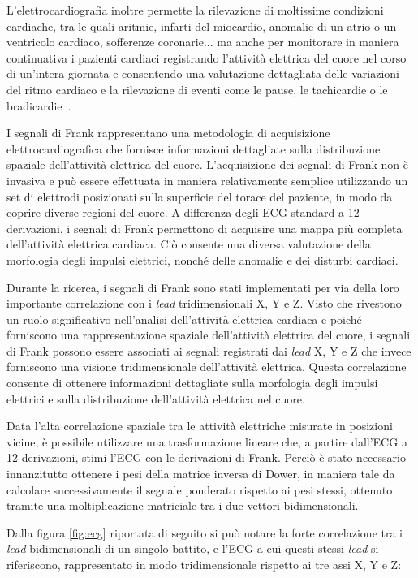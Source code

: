 L'elettrocardiografia inoltre permette la rilevazione di moltissime condizioni cardiache, tra le quali aritmie, infarti del miocardio, anomalie di un atrio o un ventricolo cardiaco, sofferenze coronarie... ma anche per monitorare in maniera continuativa i pazienti cardiaci registrando l'attività elettrica del cuore nel corso di un'intera giornata e consentendo una valutazione dettagliata delle variazioni del ritmo cardiaco e la rilevazione di eventi come le pause, le tachicardie o le bradicardie~\cite{classification}.

I segnali di Frank rappresentano una metodologia di acquisizione elettrocardiografica che fornisce informazioni dettagliate sulla distribuzione spaziale dell'attività elettrica del cuore. L'acquisizione dei segnali di Frank non è invasiva e può essere effettuata in maniera relativamente semplice utilizzando un set di elettrodi posizionati sulla superficie del torace del paziente, in modo da coprire diverse regioni del cuore. A differenza degli ECG standard a 12 derivazioni, i segnali di Frank permettono di acquisire una mappa più completa dell'attività elettrica cardiaca. Ciò consente una diversa valutazione della morfologia degli impulsi elettrici, nonché delle anomalie e dei disturbi cardiaci.

Durante la ricerca, i segnali di Frank sono stati implementati per via della loro importante correlazione con i \textit{lead} tridimensionali X, Y e Z. Visto che rivestono un ruolo significativo nell'analisi dell'attività elettrica cardiaca e poiché forniscono una rappresentazione spaziale dell'attività elettrica del cuore, i segnali di Frank possono essere associati ai segnali registrati dai \textit{lead} X, Y e Z che invece forniscono una visione tridimensionale dell'attività elettrica. Questa correlazione consente di ottenere informazioni dettagliate sulla morfologia degli impulsi elettrici e sulla distribuzione dell'attività elettrica nel cuore.

Data l'alta correlazione spaziale tra le attività elettriche misurate in posizioni vicine, è possibile utilizzare una trasformazione lineare che, a partire dall'ECG a 12 derivazioni, stimi l'ECG con le derivazioni di Frank. Perciò è stato necessario innanzitutto ottenere i pesi della matrice inversa di Dower, in maniera tale da calcolare successivamente il segnale ponderato rispetto ai pesi stessi, ottenuto tramite una moltiplicazione matriciale tra i due vettori bidimensionali.

Dalla figura \ref{fig:ecg} riportata di seguito si può notare la forte correlazione tra i \textit{lead} bidimensionali di un singolo battito, e l'ECG a cui questi stessi \textit{lead} si riferiscono, rappresentato in modo tridimensionale rispetto ai tre assi X, Y e Z:

